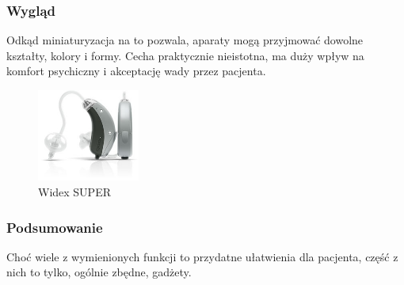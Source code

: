 \documentclass{beamer}
\begin{document}
\begin{frame}
  \frametitle{Wygląd}

  Odkąd miniaturyzacja na to pozwala, aparaty mogą przyjmować dowolne kształty,
  kolory i formy. Cecha praktycznie nieistotna, ma duży wpływ na komfort
  psychiczny i akceptację wady przez pacjenta.

  \begin{figure}
    \includegraphics[width=0.3\textwidth]{widex}
    \caption{Widex SUPER}
    \label{fig:widex}
  \end{figure}
\end{frame}

\begin{frame}
  \frametitle{Podsumowanie}
  
  Choć wiele z wymienionych funkcji to przydatne ułatwienia dla
  pacjenta, część z nich to tylko, ogólnie zbędne, gadżety.
\end{frame}
\end{document}
